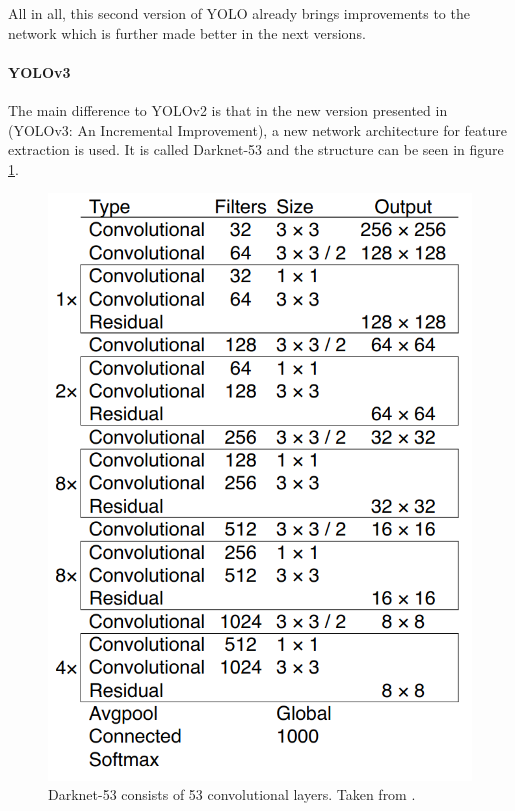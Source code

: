 All in all, this second version of YOLO already brings improvements to the network which is further made better in the next versions.


\paragraph{YOLOv3}
The main difference to YOLOv2 is that in the new version presented in \cite{yolov3} (YOLOv3: An Incremental Improvement), a new network architecture for feature extraction is used. It is called Darknet-53 and the structure can be seen in figure \ref{fig:yolov3_architecture}.\\

\begin{figure}[htb!]
	\centering
	\includegraphics[scale=0.28]{figures/yolov3_architecture.png}
	\caption{Darknet-53 consists of 53 convolutional layers. Taken from \cite{yolov3}.}
	\label{fig:yolov3_architecture}
\end{figure}

